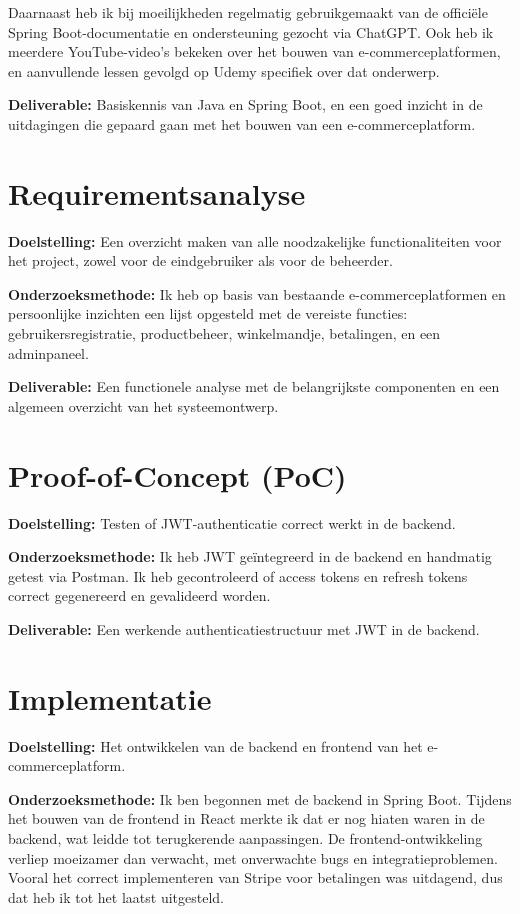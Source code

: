 Daarnaast heb ik bij moeilijkheden regelmatig gebruikgemaakt van de officiële Spring Boot-documentatie en ondersteuning gezocht via ChatGPT. Ook heb ik meerdere YouTube-video’s bekeken over het bouwen van e-commerceplatformen, en aanvullende lessen gevolgd op Udemy specifiek over dat onderwerp.

\textbf{Deliverable:} Basiskennis van Java en Spring Boot, en een goed inzicht in de uitdagingen die gepaard gaan met het bouwen van een e-commerceplatform.

\section{Requirementsanalyse}

\textbf{Doelstelling:} Een overzicht maken van alle noodzakelijke functionaliteiten voor het project, zowel voor de eindgebruiker als voor de beheerder.

\textbf{Onderzoeksmethode:} Ik heb op basis van bestaande e-commerceplatformen en persoonlijke inzichten een lijst opgesteld met de vereiste functies: gebruikersregistratie, productbeheer, winkelmandje, betalingen, en een adminpaneel.

\textbf{Deliverable:} Een functionele analyse met de belangrijkste componenten en een algemeen overzicht van het systeemontwerp.

\section{Proof-of-Concept (PoC)}

\textbf{Doelstelling:} Testen of JWT-authenticatie correct werkt in de backend.

\textbf{Onderzoeksmethode:} Ik heb JWT geïntegreerd in de backend en handmatig getest via Postman. Ik heb gecontroleerd of access tokens en refresh tokens correct gegenereerd en gevalideerd worden.

\textbf{Deliverable:} Een werkende authenticatiestructuur met JWT in de backend.

\section{Implementatie}

\textbf{Doelstelling:} Het ontwikkelen van de backend en frontend van het e-commerceplatform.

\textbf{Onderzoeksmethode:} Ik ben begonnen met de backend in Spring Boot. Tijdens het bouwen van de frontend in React merkte ik dat er nog hiaten waren in de backend, wat leidde tot terugkerende aanpassingen. De frontend-ontwikkeling verliep moeizamer dan verwacht, met onverwachte bugs en integratieproblemen. Vooral het correct implementeren van Stripe voor betalingen was uitdagend, dus dat heb ik tot het laatst uitgesteld.

